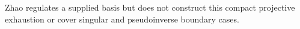 Zhao regulates a supplied basis but does not construct this compact projective exhaustion or cover singular and pseudoinverse boundary cases.